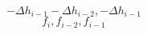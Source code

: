 \begin{equation} 
- \Delta h_{{i-1}} - \Delta h_{{i-2}} , - \Delta h_{{i-1}}
 \end{equation} 
\begin{equation} 
f_{i} , f_{{i-2}} , f_{{i-1}}
 \end{equation}